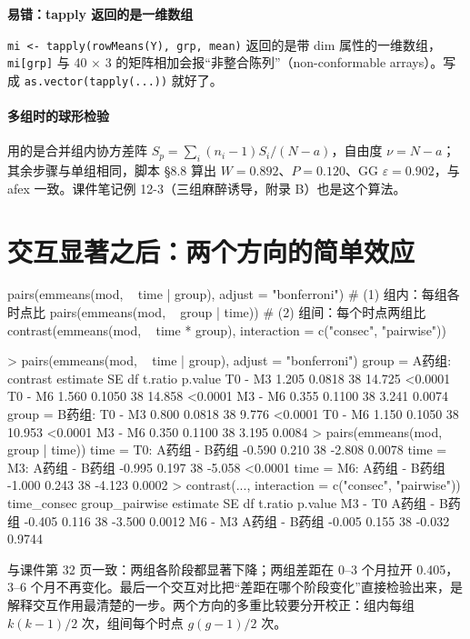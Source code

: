 \begin{studyexplain}
\textbf{易错：tapply 返回的是一维数组}


\Verb|mi <- tapply(rowMeans(Y), grp, mean)| 返回的是带 dim 属性的一维数组，\Verb|mi[grp]| 与 40 × 3 的矩阵相加会报“非整合陈列”（non-conformable arrays）。写成 \Verb|as.vector(tapply(...))| 就好了。

\end{studyexplain}


\paragraph{多组时的球形检验}用的是合并组内协方差阵 $S_p=\sum_i(n_i-1)S_i/(N-a)$，自由度 $\nu=N-a$；其余步骤与单组相同，脚本 §8.8 算出 $W=0.892$、$P=0.120$、GG $\varepsilon=0.902$，与 afex 一致。课件笔记例 12-3（三组麻醉诱导，附录 B）也是这个算法。

\section{交互显著之后：两个方向的简单效应}
\begin{rcode}[R · emmeans]
pairs(emmeans(mod, ~ time | group), adjust = "bonferroni")   # (1) 组内：每组各时点比
pairs(emmeans(mod, ~ group | time))                          # (2) 组间：每个时点两组比
contrast(emmeans(mod, ~ time * group), interaction = c("consec", "pairwise"))
\end{rcode}
\begin{routput}
> pairs(emmeans(mod, ~ time | group), adjust = "bonferroni")
group = A药组:
 contrast estimate     SE df t.ratio p.value
 T0 - M3     1.205 0.0818 38  14.725 <0.0001
 T0 - M6     1.560 0.1050 38  14.858 <0.0001
 M3 - M6     0.355 0.1100 38   3.241  0.0074
group = B药组:
 T0 - M3     0.800 0.0818 38   9.776 <0.0001
 T0 - M6     1.150 0.1050 38  10.953 <0.0001
 M3 - M6     0.350 0.1100 38   3.195  0.0084
> pairs(emmeans(mod, ~ group | time))
time = T0:   A药组 - B药组   -0.590 0.210 38  -2.808  0.0078
time = M3:   A药组 - B药组   -0.995 0.197 38  -5.058 <0.0001
time = M6:   A药组 - B药组   -1.000 0.243 38  -4.123  0.0002
> contrast(..., interaction = c("consec", "pairwise"))
 time_consec group_pairwise estimate    SE df t.ratio p.value
 M3 - T0     A药组 - B药组    -0.405 0.116 38  -3.500  0.0012
 M6 - M3     A药组 - B药组    -0.005 0.155 38  -0.032  0.9744
\end{routput}
与课件第 32 页一致：两组各阶段都显著下降；两组差距在 0–3 个月拉开 0.405，3–6 个月不再变化。最后一个交互对比把“差距在哪个阶段变化”直接检验出来，是解释交互作用最清楚的一步。两个方向的多重比较要分开校正：组内每组 $k(k-1)/2$ 次，组间每个时点 $g(g-1)/2$ 次。

